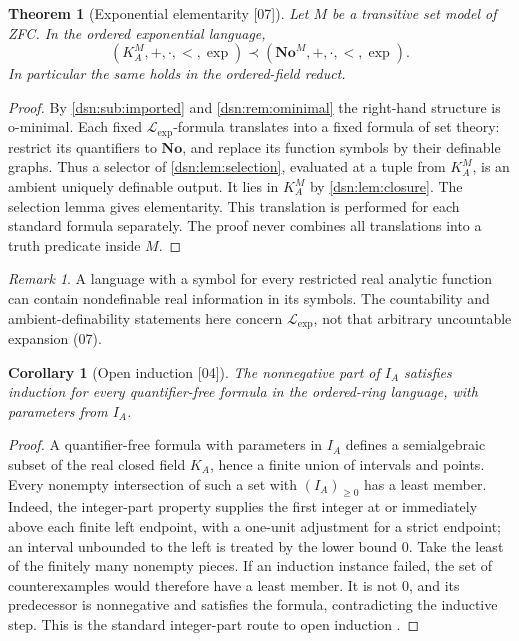\documentclass[11pt,a4paper]{article}
\numberwithin{equation}{section}
\newtheorem{theorem}{Theorem}[section]
\newtheorem{corollary}[corollary]{Corollary}
\theoremstyle{definition}
\theoremstyle{remark}
\newtheorem{remark}[remark]{Remark}
\newcommand{\No}{\mathbf{No}}
\newcommand{\Lexp}{\mathcal L_{\exp}}
\newcommand{\src}[1]{\textup{\textsf{\small[#1]}}}
\begin{document}
\begin{theorem}[Exponential elementarity \src{07}]\label{dsn:thm:elementary}
Let $M$ be a transitive set model of ZFC. In the ordered exponential
language,
\[
 (K^M_A,+,\cdot,<,\exp)\prec(\No^M,+,\cdot,<,\exp).
\]
In particular the same holds in the ordered-field reduct.
\end{theorem}
\begin{proof}
By \cref{dsn:sub:imported} and \cref{dsn:rem:ominimal} the right-hand
structure is o-minimal. Each fixed $\Lexp$-formula translates into a fixed
formula of set theory: restrict its quantifiers to $\No$, and replace its
function symbols by their definable graphs. Thus a selector of
\cref{dsn:lem:selection}, evaluated at a tuple from $K^M_A$, is an ambient
uniquely definable output. It lies in $K^M_A$ by \cref{dsn:lem:closure}.
The selection lemma gives elementarity. This translation is performed for
each standard formula separately. The proof never combines all
translations into a truth predicate inside $M$.
\end{proof}

\begin{remark}
A language with a symbol for every restricted real analytic function can
contain nondefinable real information in its symbols. The countability and
ambient-definability statements here concern $\Lexp$, not that arbitrary
uncountable expansion (07).
\end{remark}

\begin{corollary}[Open induction \src{04}]\label{dsn:cor:openinduction}
The nonnegative part of $I_A$ satisfies induction for every
quantifier-free formula in the ordered-ring language, with parameters
from $I_A$.
\end{corollary}
\begin{proof}
A quantifier-free formula with parameters in $I_A$ defines a
semialgebraic subset of the real closed field $K_A$, hence a finite
union of intervals and points. Every nonempty intersection of such a
set with $(I_A)_{\geq0}$ has a least member. Indeed, the integer-part
property supplies the first integer at or immediately above each
finite left endpoint, with a one-unit adjustment for a strict endpoint;
an interval unbounded to the left is treated by the lower bound $0$.
Take the least of the finitely many nonempty pieces.
If an induction instance failed, the set of counterexamples would
therefore have a least member. It is not $0$, and its predecessor is
nonnegative and satisfies the formula, contradicting the inductive
step. This is the standard integer-part route to open induction
\cite{Shepherdson,LM}.
\end{proof}
\end{document}
